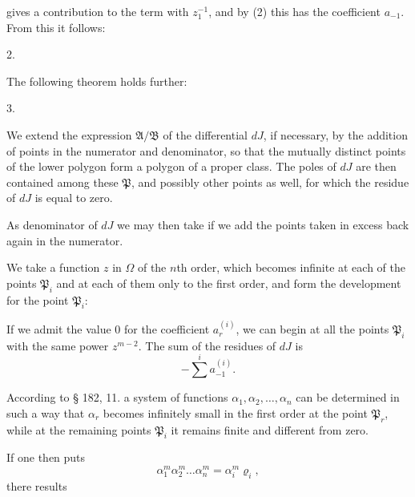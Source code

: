 gives a contribution to the term with $z_1^{-1}$, and by (2) this has the coefficient $a_{-1}$. From this it follows:

2. 

The following theorem holds further:

3. 

We extend the expression $\mathfrak{A}/\mathfrak{B}$ of the differential $dJ$, if necessary, by the addition of points in the numerator and denominator, so that the mutually distinct points of the lower polygon
form a polygon of a proper class. The poles of $dJ$ are then contained among these $\mathfrak{P}$, and possibly other points as well, for which the residue of $dJ$ is equal to zero.

As denominator of $dJ$ we may then take
if we add the points taken in excess back again in the numerator.

We take a function $z$ in $\Omega$ of the $n$th order, which becomes infinite at each of the points $\mathfrak{P}_i$ and at each of them only to the first order, and form the development for the point $\mathfrak{P}_i$:

If we admit the value 0 for the coefficient $a_r^{(i)}$, we can begin at all the points $\mathfrak{P}_i$ with the same power $z^{m-2}$. The sum of the residues of $dJ$ is
\[
-\overset{i}{\sum} a_{-1}^{(i)}.
\]

According to § 182, 11. a system of functions $\alpha_1, \alpha_2, \ldots, \alpha_n$ can be determined in such a way that $\alpha_r$ becomes infinitely small in the first order at the point $\mathfrak{P}_r$, while at the remaining points $\mathfrak{P}_i$ it remains finite and different from zero.

If one then puts
\[
\alpha_1^m \alpha_2^m \ldots \alpha_n^m = \alpha_i^m \varrho_i,
\]
there results
